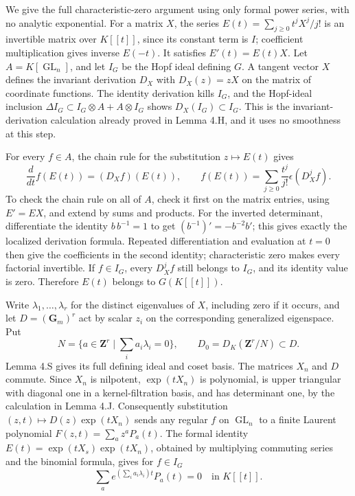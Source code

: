 \documentclass[11pt,a4paper,openany]{report}
\begin{document}
We give the full characteristic-zero argument using only formal power series, with no analytic exponential. For a matrix \(X\), the series \(E(t)=\sum_{j\geq0}t^jX^j/j!\) is an invertible matrix over \(K[[t]]\), since its constant term is \(I\); coefficient multiplication gives inverse \(E(-t)\). It satisfies \(E'(t)=E(t)X\). Let \(A=K[\operatorname{GL}_n]\), and let \(I_G\) be the Hopf ideal defining \(G\). A tangent vector \(X\) defines the invariant derivation \(D_X\) with \(D_X(z)=zX\) on the matrix of coordinate functions. The identity derivation kills \(I_G\), and the Hopf-ideal inclusion \(\Delta I_G\subset I_G\otimes A+A\otimes I_G\) shows \(D_X(I_G)\subset I_G\). This is the invariant-derivation calculation already proved in Lemma 4.H, and it uses no smoothness at this step.

For every \(f\in A\), the chain rule for the substitution \(z\mapsto E(t)\) gives \[
 \frac{d}{dt}f(E(t))=(D_Xf)(E(t)),\qquad
 f(E(t))=\sum_{j\geq0}\frac{t^j}{j!}\epsilon(D_X^jf).
\] To check the chain rule on all of \(A\), check it first on the matrix entries, using \(E'=EX\), and extend by sums and products. For the inverted determinant, differentiate the identity \(b\,b^{-1}=1\) to get \((b^{-1})'=-b^{-2}b'\); this gives exactly the localized derivation formula. Repeated differentiation and evaluation at \(t=0\) then give the coefficients in the second identity; characteristic zero makes every factorial invertible. If \(f\in I_G\), every \(D_X^jf\) still belongs to \(I_G\), and its identity value is zero. Therefore \(E(t)\) belongs to \(G(K[[t]])\).

Write \(\lambda_1,\ldots,\lambda_r\) for the distinct eigenvalues of \(X\), including zero if it occurs, and let \(D=(\mathbf G_m)^r\) act by scalar \(z_i\) on the corresponding generalized eigenspace. Put \[
 N=\{a\in\mathbf Z^r\mid\textstyle\sum_i a_i\lambda_i=0\},
 \qquad D_0=D_K(\mathbf Z^r/N)\subset D.
\] Lemma 4.S gives its full defining ideal and coset basis. The matrices \(X_n\) and \(D\) commute. Since \(X_n\) is nilpotent, \(\exp(tX_n)\) is polynomial, is upper triangular with diagonal one in a kernel-filtration basis, and has determinant one, by the calculation in Lemma 4.J. Consequently substitution \((z,t)\mapsto D(z)\exp(tX_n)\) sends any regular \(f\) on \(\operatorname{GL}_n\) to a finite Laurent polynomial \(F(z,t)=\sum_a z^aP_a(t)\). The formal identity \(E(t)=\exp(tX_s)\exp(tX_n)\), obtained by multiplying commuting series and the binomial formula, gives for \(f\in I_G\) \[
 \sum_a e^{(\sum_i a_i\lambda_i)t}P_a(t)=0\quad\text{in }K[[t]].
\]
\end{document}
